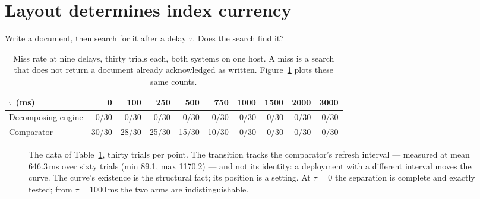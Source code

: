 \documentclass[11pt,a4paper]{article}
\begin{document}
\section{Layout determines index currency}
\label{sec:currency}

Write a document, then search for it after a delay $\tau$. Does the search find it?

\begin{table}[htbp]
\centering
\small
\caption{Miss rate at nine delays, thirty trials each, both systems on one host. A miss is a search
that does not return a document already acknowledged as written. Figure~\ref{fig:miss} plots these
same counts.}
\label{tab:miss}
\begin{tabular}{lrrrrrrrrr}
\toprule
$\tau$ (ms) & 0 & 100 & 250 & 500 & 750 & 1000 & 1500 & 2000 & 3000 \\
\midrule
Decomposing engine & 0/30 & 0/30 & 0/30 & 0/30 & 0/30 & 0/30 & 0/30 & 0/30 & 0/30 \\
Comparator         & 30/30 & 28/30 & 25/30 & 15/30 & 10/30 & 0/30 & 0/30 & 0/30 & 0/30 \\
\bottomrule
\end{tabular}
\end{table}

\begin{figure}[htbp]
\centering
{}
\caption{The data of Table~\ref{tab:miss}, thirty trials per point. The transition tracks the
comparator's refresh interval --- measured at mean 646.3\,ms over sixty trials (min 89.1,
max 1170.2) --- and not its identity: a deployment with a different interval moves the curve. The
curve's existence is the structural fact; its position is a setting. At $\tau=0$ the separation is
complete and exactly tested; from $\tau=1000$\,ms the two arms are indistinguishable.}
\label{fig:miss}
\end{figure}
\end{document}
